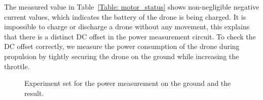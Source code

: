 \documentclass[journal]{./template/IEEEtran}
\begin{document}
\begin{table}[ht]
\caption{An example of inaccurate data from the genuine flight module of M600 drone while it parks as a ready state on the ground. (All motors and propellers are fully stopped.)}
\label{Table: motor_status}
\end{table}

The measured value in Table~\ref{Table: motor_status} shows non-negligible negative current values, which indicates the battery of the drone is being charged.
It is impossible to charge or discharge a drone without any movement, this explains that there is a distinct DC offset in the power measurement circuit.
To check the DC offset correctly, we measure the power consumption of the drone during propulsion by tightly securing the drone on the ground while increasing the throttle.

\begin{figure}[ht]
\centering
{}
\qquad
{}
\caption{Experiment set for the power measurement on the ground and the result.}
\label{fig:Ground_test}
\end{figure}
\end{document}
